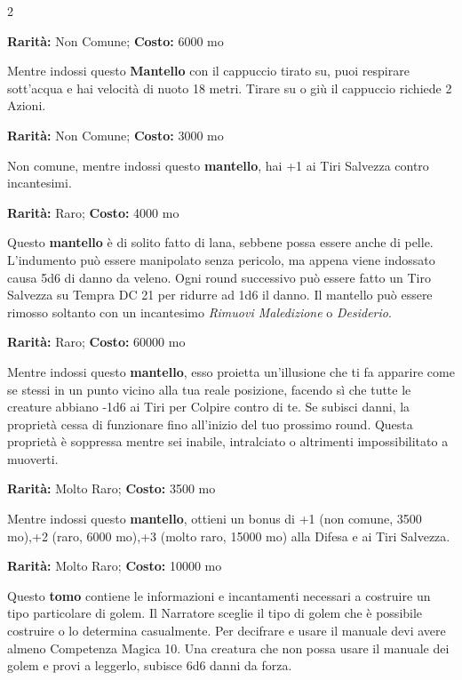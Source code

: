 \begin{multicols}{2}

\textbf{Rarità:} Non Comune; \textbf{Costo:} 6000 mo

Mentre indossi questo \textbf{Mantello} con il cappuccio tirato su, puoi respirare sott'acqua e hai velocità di nuoto 18 metri. Tirare su o giù il cappuccio richiede 2 Azioni.


\textbf{Rarità:} Non Comune; \textbf{Costo:} 3000 mo

Non comune, mentre indossi questo \textbf{mantello}, hai +1 ai Tiri Salvezza contro incantesimi.


\textbf{Rarità:} Raro; \textbf{Costo:} 4000 mo

Questo \textbf{mantello} è di solito fatto di lana, sebbene possa essere anche di pelle. L'indumento può essere manipolato senza pericolo, ma appena viene indossato causa 5d6 di danno da veleno. Ogni round successivo può essere fatto un Tiro Salvezza su Tempra DC 21 per ridurre ad 1d6 il danno. Il mantello può essere rimosso soltanto con un incantesimo \emph{Rimuovi Maledizione} o \emph{Desiderio}.


\textbf{Rarità:} Raro; \textbf{Costo:} 60000 mo

Mentre indossi questo \textbf{mantello}, esso proietta un'illusione che ti fa apparire come se stessi in un punto vicino alla tua reale posizione, facendo sì che tutte le creature abbiano -1d6 ai Tiri per Colpire contro di te. Se subisci danni, la proprietà cessa di funzionare fino all'inizio del tuo prossimo round. Questa proprietà è soppressa mentre sei inabile, intralciato o altrimenti impossibilitato a muoverti.


\textbf{Rarità:} Molto Raro; \textbf{Costo:} 3500 mo

Mentre indossi questo \textbf{mantello}, ottieni un bonus di +1 (non comune, 3500 mo),+2 (raro, 6000 mo),+3 (molto raro, 15000 mo) alla Difesa e ai Tiri Salvezza.


\textbf{Rarità:} Molto Raro; \textbf{Costo:} 10000 mo

Questo \textbf{tomo} contiene le informazioni e incantamenti necessari a costruire un tipo particolare di golem. Il Narratore sceglie il tipo di golem che è possibile costruire o lo determina casualmente. Per decifrare e usare il manuale devi avere almeno Competenza Magica 10. Una creatura che non possa usare il manuale dei golem e provi a leggerlo, subisce 6d6 danni da forza.


\end{multicols}
